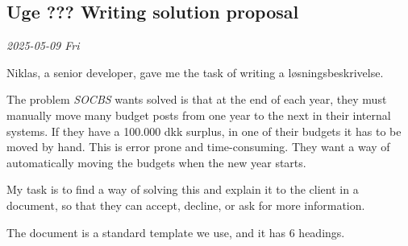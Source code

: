 \documentclass[../main.tex]{subfiles}
\begin{document}
\subsection{Uge ??? \textbf{Writing solution proposal}}

\textit{2025-05-09 Fri}

Niklas, a senior developer, gave me the task of writing a løsningsbeskrivelse.

The problem \textit{SOCBS} wants solved is that at the end of each year, they must manually move many budget posts from one year to the next in their internal systems. If they have a 100.000 dkk surplus, in one of their budgets it has to be moved by hand.
This is error prone and time-consuming. They want a way of automatically moving the budgets when the new year starts.

My task is to find a way of solving this and explain it to the client in a document, so that they can accept, decline, or ask for more information.

The document is a standard template we use, and it has 6 headings.
\end{document}
